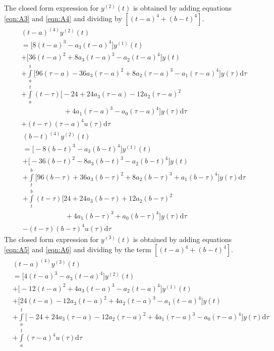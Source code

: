 \documentclass[letterpaper%
, twoside%
, 12pt%
,memoire%
, english%
,creativecommons,hyperref%
]{thETS}
\begin{document}
The closed form expression for $y^{(2)}(t)$ is obtained by adding equations \eqref{eqn:A3} and \eqref{eqn:A4} and dividing by $[(t-a)^{4}+(b-t)^{4}]$.
\begin{equation}\label{eqn:A3}
\begin{split}
	&(t-a)^{(4)}y^{(2)}(t)\\
	&=\bigg[8(t-a)^{3}-a_3(t-a)^{4}\bigg]y^{(1)}(t)\\&+\bigg[36(t-a)^{2}+8a_3(t-a)^{3}-a_2(t-a)^{4}\bigg]y(t)\\
	&+\int\limits_{a}^{t}\bigg[96(\tau-a)-36a_3(\tau-a)^{2}+8a_2(\tau-a)^{3}-a_1(\tau-a)^{4}\bigg]y(\tau)\mathrm{d}\tau\\
	&+\int\limits_{a}^{t}(t-\tau)\bigg[-24+24a_3(\tau-a)-12a_2(\tau-a)^{2}
	\\&\qquad\qquad\qquad{}+4a_1(\tau-a)^{3}-a_0(\tau-a)^{4}\bigg]y(\tau)\mathrm{d}\tau\\
	&+(t-\tau)(\tau-a)^{4}u(\tau)\mathrm{d}\tau
\end{split}
\end{equation}
\begin{equation}\label{eqn:A4}
\begin{split}
	&(b-t)^{(4)}y^{(2)}(t)\\
	&=\bigg[-8(b-t)^{3}-a_3(b-t)^{4}\bigg]y^{(1)}(t)\\&+\bigg[-36(b-t)^{2}-8a_3(b-t)^{3}-a_2(b-t)^{4}\bigg]y(t)\\
	&+\int\limits_{t}^{b}\bigg[96(b-\tau)+36a_3(b-\tau)^{2}+8a_2(b-\tau)^{3}+a_1(b-\tau)^{4}\bigg]y(\tau)\mathrm{d}\tau\\
	&+\int\limits_{t}^{b}(t-\tau)\bigg[24+24a_3(b-\tau)+12a_2(b-\tau)^{2}
	\\&\qquad\qquad\qquad{}+4a_1(b-\tau)^{3}+a_0(b-\tau)^{4}\bigg]y(\tau)\mathrm{d}\tau\\
	&-(t-\tau)(b-\tau)^{4}u(\tau)\mathrm{d}\tau
\end{split}
\end{equation}
The closed form expression for $y^{(3)}(t)$ is obtained by adding equations \eqref{eqn:A5} and \eqref{eqn:A6} and dividing by the term $[(t-a)^{4}+(b-t)^{4}]$.
\begin{equation}\label{eqn:A5}
\begin{split}
	&(t-a)^{(4)}y^{(3)}(t)\\
	&=\bigg[4(t-a)^{3} - a_3(t-a)^{4}\bigg]y^{(2)}(t)\\
	&+\bigg[-12(t-a)^{2}+4a_3(t-a)^{3}-a_2(t-a)^{4}\bigg]y^{(1)}(t)\\
	&+\bigg[24(t-a)-12a_3(t-a)^{2}+4a_2(t-a)^{3}-a_1(t-a)^{4}\bigg]y(t)\\
	&+\int\limits_{a}^{t}\bigg[-24+24a_3(\tau-a)-12a_2(\tau-a)^{2}+4a_1(\tau-a)^{3}-a_0(\tau-a)^{4}\bigg]y(\tau)\mathrm{d}\tau\\
	&+\int\limits_{a}^{t}(\tau-a)^{4}u(\tau)\mathrm{d}\tau
\end{split}
\end{equation}
\end{document}
